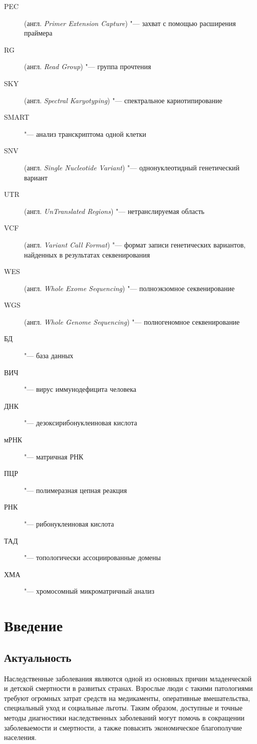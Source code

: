 \documentclass[a4paper,14pt]{extarticle}
\newcommand{\engterm}[1]{англ. \textenglish{\textit{#1}}}
\begin{document}
\begin{description}
	\item[PEC] (\engterm{Primer Extension Capture}) "--- захват с помощью расширения праймера
	\item[RG] (\engterm{Read Group}) "--- группа прочтения
	\item[SKY] (\engterm{Spectral Karyotyping}) "--- спектральное кариотипирование
	\item[SMART] "--- анализ транскриптома одной клетки
	\item[SNV] (\engterm{Single Nucleotide Variant}) "--- однонуклеотидный генетический вариант
	\item[UTR] (\engterm{UnTranslated Regions}) "--- нетранслируемая область
	\item[VCF] (\engterm{Variant Call Format}) "--- формат записи генетических вариантов, найденных в результатах секвенирования
	\item[WES] (\engterm{Whole Exome Sequencing}) "--- полноэкзомное секвенирование
	\item[WGS] (\engterm{Whole Genome Sequencing}) "--- полногеномное секвенирование
	\item[БД] "--- база данных
	\item[ВИЧ] "--- вирус иммунодефицита человека
	\item[ДНК] "--- дезоксирибонуклеиновая кислота
	\item[мРНК] "--- матричная РНК
	\item[ПЦР] "--- полимеразная цепная реакция
	\item[РНК] "--- рибонуклеиновая кислота
	\item[ТАД] "--- топологически ассоциированные домены
	\item[ХМА] "--- хромосомный микроматричный анализ
\end{description}

\newpage

\section{Введение}

\subsection{Актуальность}

Наследственные заболевания являются одной из основных причин младенческой и детской смертности в развитых странах.
Взрослые люди с такими патологиями требуют огромных затрат средств на медикаменты, оперативные вмешательства, специальный уход и социальные льготы.
Таким образом, доступные и точные методы диагностики наследственных заболеваний могут помочь в сокращении заболеваемости и смертности, а также повысить экономическое благополучие населения.
\end{document}
